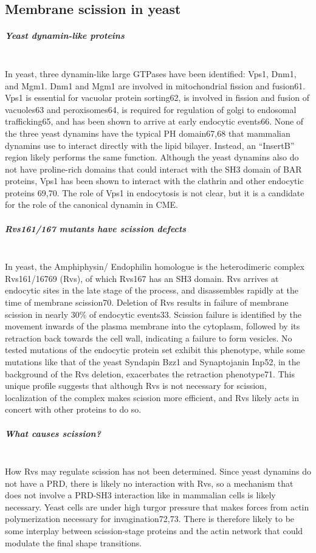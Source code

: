 	\subsection{Membrane scission in yeast}
		\subparagraph{Yeast dynamin-like proteins}
	\mbox{} \\
In yeast, three dynamin-like large GTPases have been identified: Vps1, Dnm1, and Mgm1. Dnm1 and Mgm1 are involved in mitochondrial fission and fusion61. Vps1 is essential for vacuolar protein sorting62, is involved in fission and fusion of vacuoles63 and peroxisomes64, is required for regulation of golgi to endosomal trafficking65, and has been shown to arrive at early endocytic events66. None of the three yeast dynamins have the typical PH domain67,68 that mammalian dynamins use to interact directly with the lipid bilayer. Instead, an “InsertB” region likely performs the same function. Although the yeast dynamins also do not have proline-rich domains that could interact with the SH3 domain of BAR proteins, Vps1 has been shown to interact with the clathrin and other endocytic proteins 69,70. The role of Vps1 in endocytosis is not clear, but it is a candidate for the role of the canonical dynamin in CME.





	\subparagraph{Rvs161/167 mutants have scission defects}
\mbox{} \\
In yeast, the Amphiphysin/ Endophilin homologue is the heterodimeric complex Rvs161/16769 (Rvs), of which Rvs167 has an SH3 domain. Rvs arrives at endocytic sites in the late stage of the process, and disassembles rapidly at the time of membrane scission70. Deletion of Rvs results in failure of membrane scission in nearly 30\% of endocytic events33. Scission failure is identified by the movement inwards of the plasma membrane into the cytoplasm, followed by its retraction back towards the cell wall, indicating a failure to form vesicles. No tested mutations of the endocytic protein set exhibit this phenotype, while some mutations like that of the yeast Syndapin Bzz1 and Synaptojanin Inp52, in the background of the Rvs deletion, exacerbates the retraction phenotype71. This unique profile suggests that although Rvs is not necessary for scission, localization of the complex makes scission more efficient, and Rvs likely acts in concert with other proteins to do so. 


	\subparagraph{What causes scission?}
\mbox{} \\
How Rvs may regulate scission has not been determined. Since yeast dynamins do not have a PRD, there is likely no interaction with Rvs, so a mechanism that does not involve a PRD-SH3 interaction like in mammalian cells is likely necessary. Yeast cells are under high turgor pressure that makes forces from actin polymerization necessary for invagination72,73. There is therefore likely to be some interplay between scission-stage proteins and the actin network that could modulate the final shape transitions. 


